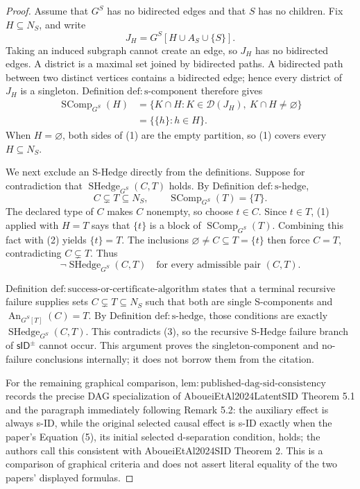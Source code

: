 \documentclass{article}
\begin{document}
\begin{proof}
Assume that \(G^S\) has no bidirected edges and that \(S\) has no children.  Fix \(H\subseteq N_S\), and write
\[
  J_H=G^S[H\cup A_S\cup\{S\}].
\]
Taking an induced subgraph cannot create an edge, so \(J_H\) has no bidirected edges.  A district is a maximal set joined by bidirected paths.  A bidirected path between two distinct vertices contains a bidirected edge; hence every district of \(J_H\) is a singleton.  Definition \(\mathrm{def:s\text{-}component}\) therefore gives
\[
\begin{aligned}
 \operatorname{SComp}_{G^S}(H)
 &=\bigl\{K\cap H:K\in\mathcal D(J_H),\ K\cap H\ne\varnothing\bigr\}\\
 &=\bigl\{\{h\}:h\in H\bigr\}. \tag{1}
\end{aligned}
\]
When \(H=\varnothing\), both sides of (1) are the empty partition, so (1) covers every \(H\subseteq N_S\).

We next exclude an S-Hedge directly from the definitions.  Suppose for contradiction that \(\operatorname{SHedge}_{G^S}(C,T)\) holds.  By Definition \(\mathrm{def:s\text{-}hedge}\),
\[
 C\subsetneq T\subseteq N_S,
 \qquad
 \operatorname{SComp}_{G^S}(T)=\{T\}. \tag{2}
\]
The declared type of \(C\) makes \(C\) nonempty, so choose \(t\in C\).  Since \(t\in T\), (1) applied with \(H=T\) says that \(\{t\}\) is a block of \(\operatorname{SComp}_{G^S}(T)\).  Combining this fact with (2) yields \(\{t\}=T\).  The inclusions \(\varnothing\ne C\subseteq T=\{t\}\) then force \(C=T\), contradicting \(C\subsetneq T\).  Thus
\[
  \neg\operatorname{SHedge}_{G^S}(C,T)
  \quad\text{for every admissible pair }(C,T). \tag{3}
\]

Definition \(\mathrm{def:success\text{-}or\text{-}certificate\text{-}algorithm}\) states that a terminal recursive failure supplies sets \(C\subsetneq T\subseteq N_S\) such that both are single S-components and \(\operatorname{An}_{G^S[T]}(C)=T\).  By Definition \(\mathrm{def:s\text{-}hedge}\), those conditions are exactly \(\operatorname{SHedge}_{G^S}(C,T)\).  This contradicts (3), so the recursive S-Hedge failure branch of \(\mathsf{sID}^{\pm}\) cannot occur.  This argument proves the singleton-component and no-failure conclusions internally; it does not borrow them from the citation.

For the remaining graphical comparison, \(\mathrm{lem:published\text{-}dag\text{-}sid\text{-}consistency}\) records the precise DAG specialization of AboueiEtAl2024LatentSID Theorem 5.1 and the paragraph immediately following Remark 5.2: the auxiliary effect is always s-ID, while the original selected causal effect is s-ID exactly when the paper's Equation (5), its initial selected d-separation condition, holds; the authors call this consistent with AboueiEtAl2024SID Theorem 2.  This is a comparison of graphical criteria and does not assert literal equality of the two papers' displayed formulas.


\end{proof}
\end{document}
